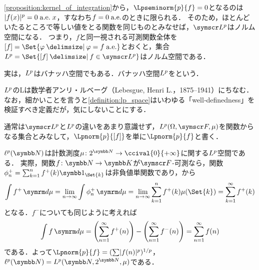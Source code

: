 \documentclass[../../main]{subfiles}
\begin{document}
\cref{proposition:kernel_of_integration}から，\(\Lpseminorm{p}{f}=0\)となるのは\(\abs{f(x)}^p=0\almosteverywhere[][x]\)，すなわち\(f=0\almosteverywhere\)のときに限られる．
そのため，ほとんどいたるところで等しい値をとる関数を同じものとみなせば，\(\Lebesgue*{p}\)はノルム空間になる．
つまり，\(f\)と同一視される可測関数全体を\([f]=\Set{\varphi\given\varphi=f\almosteverywhere}\)とおくと，集合\(\Lebesgue{p}=\Set{[f]\given f\in\Lebesgue*{p}}\)はノルム空間である．

実は，\(\Lebesgue{p}\)はバナッハ空間でもある．バナッハ空間\(\Lebesgue{p}\)をという．


\begin{note}
  \(\Lebesgue{p}\)のLは数学者アンリ・ルベーグ（Lebesgue, Henri L.，1875–1941）にちなむ．
  なお，細かいことを言うと\cref{definition:lp_space}はいわゆる「well‐definedness」を検証すべき定義だが，気にしないことにする．
\end{note}

通常は\(\Lebesgue*{p}\)と\(\Lebesgue{p}\)の違いをあまり意識せず，\(\Lebesgue{p}(\Omega,\sigmaalg{F},\mu)\)を関数からなる集合とみなして，\(\Lpnorm{p}{[f]}\)を単に\(\Lpnorm{p}{f}\)と書く．

\begin{example}
  \(\lebesgue{p}(\numset{N})\)は計数測度\(\mu\colon\powerset{\numset{N}}\to\ccival{0}{+\infty}\)に関する\(\Lebesgue{p}\)空間である．
  実際，関数\(f\colon\numset{N}\to\numset{K}\)が\(\sigmaalg{F}\)‐可測なら，関数\(\phi^{\mathord{+}}_n=\sum_{k=1}^nf^{\mathord{+}}(k)\indicator_{\Set{k}}\)は非負値単関数であり，から
  \[
    \int f^{\mathord{+}}\measured{\mu} = \lim_{n\to\infty}\int\phi_n^{\mathord{+}}\measured{\mu}
    = \lim_{n\to\infty}\sum_{k=1}^nf^{\mathord{+}}(k)\mu(\Set{k})
    = \sum_{k=1}^\infty f^{\mathord{+}}(k)
  \]
  となる．\(f^{\mathord{-}}\)についても同じように考えれば
  \[
    \int f\measured{\mu} = \pqty*{\sum_{n=1}^\infty f^{\mathord{+}}(n)}-\pqty*{\sum_{n=1}^\infty f^{\mathord{-}}(n)}
    = \sum_{n=1}^\infty f(n)
  \]
  である．よって\(\Lpnorm{p}{f}=(\sum\abs{f(n)}^p)^{1/p}\)，\(\lebesgue{p}(\numset{N})=\Lebesgue{p}(\numset{N},\powerset{\numset{N}},\mu)\)である．
\end{example}
\end{document}
